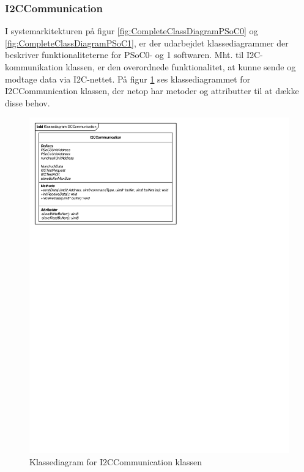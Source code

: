 \subsubsection{I2CCommunication}
I systemarkitekturen på figur \ref{fig:CompleteClassDiagramPSoC0} og \ref{fig:CompleteClassDiagramPSoC1}, er der udarbejdet klassediagrammer der beskriver funktionaliteterne for PSoC0- og 1 softwaren. Mht. til I2C-kommunikation klassen, er den overordnede funktionalitet, at kunne sende og modtage data via I2C-nettet. På figur \ref{figure:klassediagramI2CCommunication} ses klassediagrammet for I2CCommunication klassen, der netop har metoder og attributter til at dække disse behov.


\begin{figure}[H]
	\centering
	\includegraphics[]{DesignOgImplementering/images/I2CCommunication}
	\caption{Klassediagram for I2CCommunication klassen}
	\label{figure:klassediagramI2CCommunication}
\end{figure}

